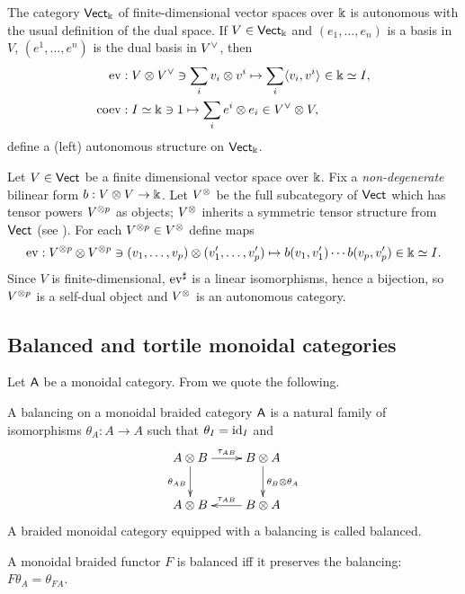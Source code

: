 \begin{example}\label{xmp:vect-duality}
  The category $\catVect[\fk]$ of finite-dimensional vector spaces over
  $\fk$ is autonomous with the usual definition of the dual space. If
  $V \in \catVect[\fk]$ and $(e_1, \ldots, e_n)$ is a basis in $V$, $(e^1, \ldots,
  e^n)$ is the dual basis in $\rdl{V}$, then
  \begin{align*}
    \ev &: V \otimes \rdl{V} \ni \sum_i v_i \otimes v^i \mapsto \sum_i \pairing{v_i}{v^i}
    \in \fk \simeq I,
    \\
    \coev &: I \simeq \fk \ni 1 \mapsto \sum_i e^i \otimes e_i \in \rdl{V} \otimes V,
  \end{align*}
  define a (left) autonomous structure on $\catVect[\fk]$. 
\end{example}

\begin{example}\label{xmp:vect-duality-nondeg}
  Let $V \in \catVect$ be a finite dimensional vector space over
  $\fk$. Fix a \emph{non-degenerate} bilinear form $b: V\otimes V \to
  \fk$. Let $\freemc{V}$ be the full subcategory of $\catVect$ which
  has tensor powers $V\tp{p}$ as objects; $\freemc{V}$ inherits a
  symmetric tensor structure from $\catVect$ (see
  ). For each $V\tp{p} \in \freemc{V}$ define maps
  \begin{equation*}
    \ev: V\tp{p} \otimes V\tp{p} \ni (v_1, \ldots, v_p) \otimes (v'_1, \ldots, v'_p) \mapsto
    b(v_1, v'_1) \cdots b(v_p, v'_p) \in \fk \simeq I.
  \end{equation*}
  Since $V$ is finite-dimensional, $\ev^\sharp$ is a linear isomorphisms,
  hence a bijection, so $V\tp{p}$ is a self-dual object and
  $\freemc{V}$ is an autonomous category.
\end{example}


\subsection{Balanced and tortile monoidal categories}
\label{sec:tortile}

Let $\A$ be a monoidal category. From \cite{joyal-street;btc} we quote
the following.
\begin{definition}
  A balancing on a monoidal braided category $\A$ is a natural family of
  isomorphisms $\theta_A:A\to A$ such that $\theta_I = \id_I$ and 
  \begin{equation*}
    \xymatrix{%
      A\otimes B
      &
      B\otimes A
      \\
      A\otimes B
      &
      B\otimes A
      \ar "1,1";"1,2" ^{\tau_{AB}}
      \ar "1,1";"2,1" _{\theta_{AB}}
      \ar "2,2";"2,1" _{\tau_{AB}}
      \ar "1,2";"2,2" ^{\theta_B\otimes\theta_A}
      }
  \end{equation*}
  A braided monoidal category equipped with a balancing is called
  balanced.

  A monoidal braided functor $F$ is balanced iff it preserves the
  balancing: $F\theta_A = \theta_{FA}$.
\end{definition}

